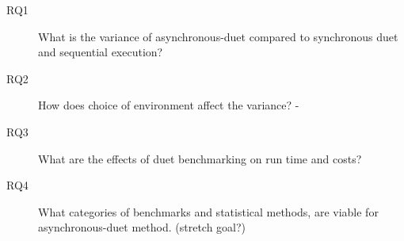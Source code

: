 \begin{description}
	\item[RQ1] What is the variance of asynchronous-duet compared to synchronous duet and sequential execution?
	\item[RQ2] How does choice of environment affect the variance? - \citet{laaber2019software}
	\item[RQ3] What are the effects of duet benchmarking on run time and costs?
	\item[RQ4] What categories of benchmarks and statistical methods, are viable for asynchronous-duet method. (stretch goal?)
\end{description}
